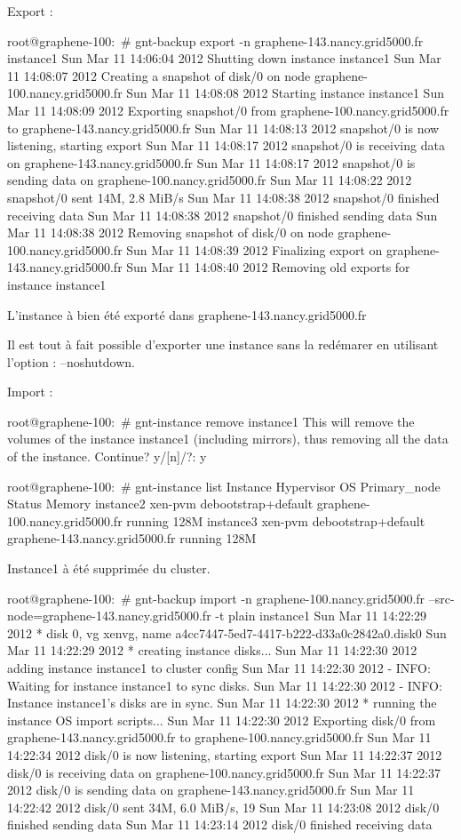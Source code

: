 Export :

root@graphene-100:~# gnt-backup export -n graphene-143.nancy.grid5000.fr instance1
Sun Mar 11 14:06:04 2012 Shutting down instance instance1
Sun Mar 11 14:08:07 2012 Creating a snapshot of disk/0 on node graphene-100.nancy.grid5000.fr
Sun Mar 11 14:08:08 2012 Starting instance instance1
Sun Mar 11 14:08:09 2012 Exporting snapshot/0 from graphene-100.nancy.grid5000.fr to graphene-143.nancy.grid5000.fr
Sun Mar 11 14:08:13 2012 snapshot/0 is now listening, starting export
Sun Mar 11 14:08:17 2012 snapshot/0 is receiving data on graphene-143.nancy.grid5000.fr
Sun Mar 11 14:08:17 2012 snapshot/0 is sending data on graphene-100.nancy.grid5000.fr
Sun Mar 11 14:08:22 2012 snapshot/0 sent 14M, 2.8 MiB/s
Sun Mar 11 14:08:38 2012 snapshot/0 finished receiving data
Sun Mar 11 14:08:38 2012 snapshot/0 finished sending data
Sun Mar 11 14:08:38 2012 Removing snapshot of disk/0 on node graphene-100.nancy.grid5000.fr
Sun Mar 11 14:08:39 2012 Finalizing export on graphene-143.nancy.grid5000.fr
Sun Mar 11 14:08:40 2012 Removing old exports for instance instance1

L'instance à bien été exporté dans graphene-143.nancy.grid5000.fr

Il est tout à fait possible d'exporter une instance sans la redémarer en utilisant l'option : --noshutdown.

Import :

root@graphene-100:~# gnt-instance remove instance1
This will remove the volumes of the instance instance1 (including
mirrors), thus removing all the data of the instance. Continue?
y/[n]/?: y

root@graphene-100:~# gnt-instance list
Instance  Hypervisor OS                  Primary_node                   Status  Memory
instance2 xen-pvm    debootstrap+default graphene-100.nancy.grid5000.fr running   128M
instance3 xen-pvm    debootstrap+default graphene-143.nancy.grid5000.fr running   128M

Instance1 à été supprimée du cluster.

root@graphene-100:~# gnt-backup import -n graphene-100.nancy.grid5000.fr --src-node=graphene-143.nancy.grid5000.fr -t plain instance1
Sun Mar 11 14:22:29 2012 * disk 0, vg xenvg, name a4cc7447-5ed7-4417-b222-d33a0c2842a0.disk0
Sun Mar 11 14:22:29 2012 * creating instance disks...
Sun Mar 11 14:22:30 2012 adding instance instance1 to cluster config
Sun Mar 11 14:22:30 2012  - INFO: Waiting for instance instance1 to sync disks.
Sun Mar 11 14:22:30 2012  - INFO: Instance instance1's disks are in sync.
Sun Mar 11 14:22:30 2012 * running the instance OS import scripts...
Sun Mar 11 14:22:30 2012 Exporting disk/0 from graphene-143.nancy.grid5000.fr to graphene-100.nancy.grid5000.fr
Sun Mar 11 14:22:34 2012 disk/0 is now listening, starting export
Sun Mar 11 14:22:37 2012 disk/0 is receiving data on graphene-100.nancy.grid5000.fr
Sun Mar 11 14:22:37 2012 disk/0 is sending data on graphene-143.nancy.grid5000.fr
Sun Mar 11 14:22:42 2012 disk/0 sent 34M, 6.0 MiB/s, 19%
Sun Mar 11 14:23:08 2012 disk/0 finished sending data
Sun Mar 11 14:23:14 2012 disk/0 finished receiving data

